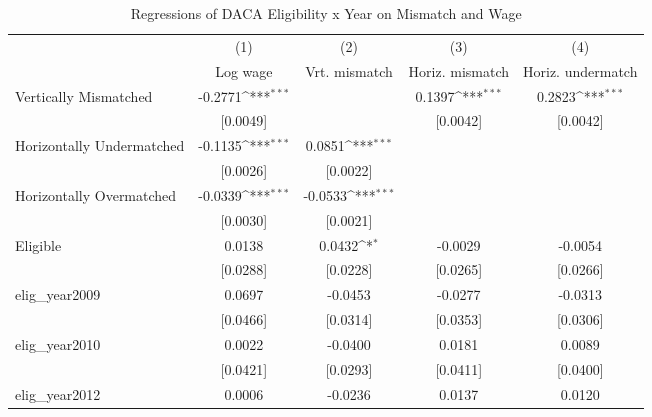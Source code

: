 \begin{table}[htbp]\centering
\def\sym#1{\ifmmode^{#1}\else\(^{#1}\)\fi}
\caption{Regressions of DACA Eligibility x Year on Mismatch and Wage}
\begin{tabular}{l*{4}{c}}
\toprule
                    &\multicolumn{1}{c}{(1)}         &\multicolumn{1}{c}{(2)}         &\multicolumn{1}{c}{(3)}         &\multicolumn{1}{c}{(4)}         \\
                    &    Log wage         &Vrt. mismatch         &Horiz. mismatch         &Horiz. undermatch         \\
\midrule
Vertically Mismatched&     -0.2771\sym{***}&                     &      0.1397\sym{***}&      0.2823\sym{***}\\
                    &    [0.0049]         &                     &    [0.0042]         &    [0.0042]         \\
\addlinespace
Horizontally Undermatched&     -0.1135\sym{***}&      0.0851\sym{***}&                     &                     \\
                    &    [0.0026]         &    [0.0022]         &                     &                     \\
\addlinespace
Horizontally Overmatched&     -0.0339\sym{***}&     -0.0533\sym{***}&                     &                     \\
                    &    [0.0030]         &    [0.0021]         &                     &                     \\
\addlinespace
Eligible            &      0.0138         &      0.0432\sym{*}  &     -0.0029         &     -0.0054         \\
                    &    [0.0288]         &    [0.0228]         &    [0.0265]         &    [0.0266]         \\
\addlinespace
elig\_year2009       &      0.0697         &     -0.0453         &     -0.0277         &     -0.0313         \\
                    &    [0.0466]         &    [0.0314]         &    [0.0353]         &    [0.0306]         \\
\addlinespace
elig\_year2010       &      0.0022         &     -0.0400         &      0.0181         &      0.0089         \\
                    &    [0.0421]         &    [0.0293]         &    [0.0411]         &    [0.0400]         \\
\addlinespace
elig\_year2012       &      0.0006         &     -0.0236         &      0.0137         &      0.0120         \\

\end{tabular}
\end{table}

